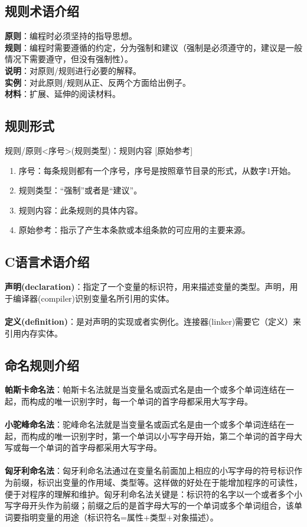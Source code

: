 \documentclass[UTF8,a4paper,12pt]{article}
\begin{document}
	\subsection{规则术语介绍}
	\textbf{原则}：编程时必须坚持的指导思想。\\
	\textbf{规则}：编程时需要遵循的约定，分为强制和建议（强制是必须遵守的，建议是一般情况下需要遵守，但没有强制性）。\\
	\textbf{说明}：对原则/规则进行必要的解释。\\
	\textbf{实例}：对此原则/规则从正、反两个方面给出例子。\\
	\textbf{材料}：扩展、延伸的阅读材料。\\
	
	\subsection{规则形式}
	\centerline{规则/原则<序号>(规则类型)：规则内容 [原始参考]}
	\begin{enumerate}
	\item 序号：每条规则都有一个序号，序号是按照章节目录的形式，从数字1开始。
	\item 规则类型：“强制”或者是“建议”。
	\item 规则内容：此条规则的具体内容。
	\item 原始参考：指示了产生本条款或本组条款的可应用的主要来源。
	\end{enumerate}

	\subsection{C语言术语介绍}
	\textbf{声明(declaration)}：指定了一个变量的标识符，用来描述变量的类型。声明，用于编译器(compiler)识别变量名所引用的实体。\\
	\\
	\textbf{定义(definition)}：是对声明的实现或者实例化。连接器(linker)需要它（定义）来引用内存实体。\\

	\subsection{命名规则介绍}
	\textbf{帕斯卡命名法}：帕斯卡名法就是当变量名或函式名是由一个或多个单词连结在一起，而构成的唯一识别字时，每一个单词的首字母都采用大写字母。 \\
	\\
	\textbf{小驼峰命名法}：驼峰命名法就是当变量名或函式名是由一个或多个单词连结在一起，而构成的唯一识别字时，第一个单词以小写字母开始，第二个单词的首字母大写或每一个单词的首字母都采用大写字母。\\
	\\
	\textbf{匈牙利命名法}：匈牙利命名法通过在变量名前面加上相应的小写字母的符号标识作为前缀，标识出变量的作用域、类型等。这样做的好处在于能增加程序的可读性，便于对程序的理解和维护。匈牙利命名法关键是：标识符的名字以一个或者多个小写字母开头作为前缀；前缀之后的是首字母大写的一个单词或多个单词组合，该单词要指明变量的用途（标识符名=属性+类型+对象描述）。
	
\end{document}
